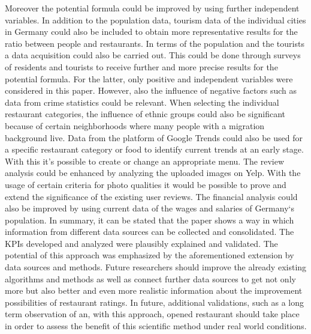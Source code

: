 Moreover the potential formula could be improved by using further independent variables. In addition to the population data, tourism data of the individual cities in Germany could also be included to obtain more representative results for the ratio between people and restaurants. In terms of the population and the tourists a data acquisition could also be carried out. This could be done through surveys of residents and tourists to receive further and more precise results for the potential formula. For the latter, only positive and independent variables were considered in this paper. However, also the influence of negative factors such as data from crime statistics could be relevant. \newline
When selecting the individual restaurant categories, the influence of ethnic groups could also be significant because of certain neighborhoods where many people with a migration background live. Data from the platform of Google Trends could also be used for a specific restaurant category or food to identify current trends at an early stage. With this it's possible to create or change an appropriate menu. \newline
The review analysis could be enhanced by analyzing the uploaded images on Yelp. With the usage of certain criteria for photo qualities it would be possible to prove and extend the significance of the existing user reviews. The financial analysis could also be improved by using current data of the wages and salaries of Germany‘s population.\newline
In summary, it can be stated that the paper shows a way in which information from different data sources can be collected and consolidated. The \acp{KPI} developed and analyzed were plausibly explained and validated. The potential of this approach was emphasized by the aforementioned extension by data sources and methods. Future researchers should improve the already existing algorithms and methods as well as connect further data sources to get not only more but also better and even more realistic information about the improvement possibilities of restaurant ratings.
In future, additional validations, such as a long term observation of an, with this approach, opened restaurant should take place in order to assess the benefit of this scientific method under real world conditions. 

